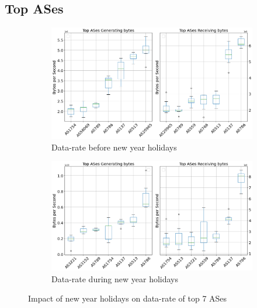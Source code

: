 \documentclass[10pt, journal, letterpaper]{IEEEtran}
\begin{document}
\subsection{Top ASes}
\begin{figure}[hbt!]
    \centering
    \begin{subfigure}{\columnwidth}
          \centering
          \includegraphics[width=\columnwidth]{img/OWBCH_top7ASes_bps.png}
          \caption{Data-rate before new year holidays}
          \label{fig:OWBCH_topAS_bps}
    \end{subfigure}
    \begin{subfigure}{\columnwidth}
          \centering
          \includegraphics[width=\columnwidth]{img/CH2_top7ASes_bps.png}
          \caption{Data-rate during new year holidays}
          \label{fig:CH_topAS_bps}
    \end{subfigure}
    \caption{Impact of new year holidays on data-rate of top 7 ASes}
    \label{fig:topAS_bps_OW_CH}
\end{figure}
\end{document}
